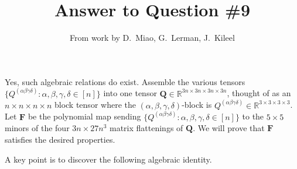 \documentclass[11pt]{amsart}
\begin{document}
\title{Answer to Question \#9}

\author{From work by D.~Miao, G.~Lerman, J.~Kileel}

\maketitle

Yes, such algebraic relations do exist.  
Assemble the various tensors $\{Q^{(\alpha \beta \gamma \delta)} : \alpha, \beta, \gamma, \delta \in [n] \}$ into one tensor $\mathbf{Q} \in \mathbb{R}^{3n \times 3n \times 3n \times 3n}$, thought of as an $n \times n \times n \times n$ block tensor where the $(\alpha, \beta, \gamma, \delta)$-block is $Q^{(\alpha \beta \gamma \delta)} \in \mathbb{R}^{3 \times 3 \times 3 \times 3}$. 
Let $\mathbf{F}$ be the polynomial map sending $\{Q^{(\alpha \beta \gamma \delta)} : \alpha, \beta, \gamma, \delta \in [n] \}$ to the $5 \times 5$ minors of the four $3n \times 27n^3$ matrix flattenings of $\mathbf{Q}$.
We will prove that $\mathbf{F}$ satisfies the desired properties.

A key point is to discover the following algebraic identity.  
\end{document}
